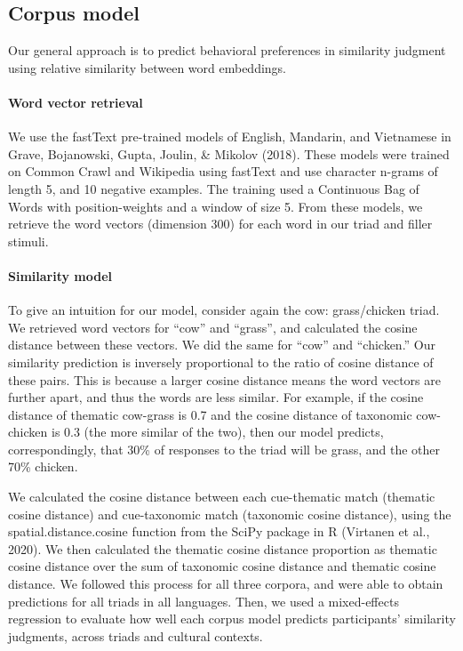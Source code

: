 \documentclass[10pt, letterpaper]{article}
\begin{document}
\hypertarget{corpus-model}{%
\subsection{Corpus model}\label{corpus-model}}

Our general approach is to predict behavioral preferences in similarity
judgment using relative similarity between word embeddings.

\hypertarget{word-vector-retrieval}{%
\paragraph{Word vector retrieval}\label{word-vector-retrieval}}

We use the fastText pre-trained models of English, Mandarin, and
Vietnamese in Grave, Bojanowski, Gupta, Joulin, \& Mikolov (2018). These
models were trained on Common Crawl and Wikipedia using fastText and use
character n-grams of length 5, and 10 negative examples. The training
used a Continuous Bag of Words with position-weights and a window of
size 5. From these models, we retrieve the word vectors (dimension 300)
for each word in our triad and filler stimuli.

\hypertarget{similarity-model}{%
\paragraph{Similarity model}\label{similarity-model}}

To give an intuition for our model, consider again the cow:
grass/chicken triad. We retrieved word vectors for ``cow'' and
``grass'', and calculated the cosine distance between these vectors. We
did the same for ``cow'' and ``chicken.'' Our similarity prediction is
inversely proportional to the ratio of cosine distance of these pairs.
This is because a larger cosine distance means the word vectors are
further apart, and thus the words are less similar. For example, if the
cosine distance of thematic cow-grass is 0.7 and the cosine distance of
taxonomic cow-chicken is 0.3 (the more similar of the two), then our
model predicts, correspondingly, that 30\% of responses to the triad
will be grass, and the other 70\% chicken.

We calculated the cosine distance between each cue-thematic match
(thematic cosine distance) and cue-taxonomic match (taxonomic cosine
distance), using the spatial.distance.cosine function from the SciPy
package in R (Virtanen et al., 2020). We then calculated the thematic
cosine distance proportion as thematic cosine distance over the sum of
taxonomic cosine distance and thematic cosine distance. We followed this
process for all three corpora, and were able to obtain predictions for
all triads in all languages. Then, we used a mixed-effects regression to
evaluate how well each corpus model predicts participants' similarity
judgments, across triads and cultural contexts.
\end{document}
